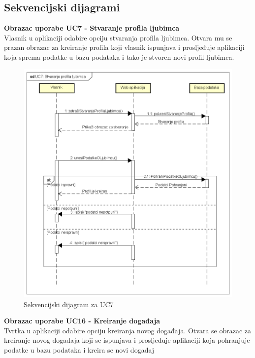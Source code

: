 			\subsection{Sekvencijski dijagrami}
				
				\textbf{Obrazac uporabe UC7 - Stvaranje profila ljubimca}\\
				\indent Vlasnik u aplikaciji odabire opciju stvaranja profila ljubimca. Otvara mu se prazan obrazac za kreiranje profila koji vlasnik ispunjava i prosljeđuje aplikaciji koja sprema podatke u bazu podataka i tako je stvoren novi profil ljubimca.
				
				\begin{figure}[H]
					\includegraphics[scale=0.5]{slike/UC7.PNG} %
					\centering
					\caption{Sekvencijski dijagram za UC7}
				\end{figure}
				
				\pagebreak
				\textbf{Obrazac uporabe UC16 - Kreiranje događaja}\\
				\indent Tvrtka u aplikaciji odabire opciju kreiranja novog događaja. Otvara se obrazac za kreiranje novog događaja koji se ispunjava i prosljeđuje aplikaciji koja pohranjuje podatke u bazu podataka i kreira se novi događaj
				
